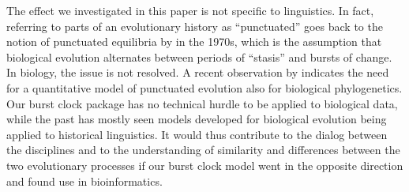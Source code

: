 \documentclass[]{rsos}%
\begin{document}
The effect we investigated in this paper
is not specific to linguistics. In fact, referring to parts
of an evolutionary history as “punctuated” goes back to the notion of
punctuated equilibria by \textcite{eldredge1972punctuated} in the 1970s, which
is the
assumption that biological evolution alternates between periods of “stasis” and
bursts of change.
In biology, the issue is not resolved. A recent observation by
\textcite{janzen2021nucleotide} indicates the need for a quantitative model of
punctuated evolution also for biological phylogenetics.
Our burst clock package has no technical hurdle to be applied to
biological data, while
the past has mostly seen models developed for biological evolution being applied to
historical linguistics.
It would thus contribute to the dialog between the disciplines and to the
understanding of similarity
and differences between the two evolutionary processes
\parencite{list2016alignments,levinson2012tools}
if our burst clock model went in the opposite direction and
found use in bioinformatics.


\printbibliography{}
\end{document}
